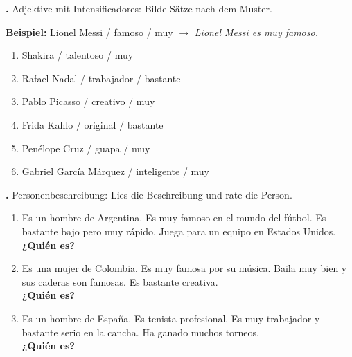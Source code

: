 \documentclass[11pt,a4paper]{article}
\newcommand{\luecke}[1]{\underline{\hspace{#1}}}
\newcommand{\punktebox}[1]{\hfill\fbox{\small \_\_/#1}}
\newcommand{\es}[1]{\textit{#1}}
\newcounter{aufgabe}
\newcommand{\aufgabe}[2]{%
    \stepcounter{aufgabe}%
    \vspace{0.8em}%
    \noindent\textbf{\theaufgabe.} #1 \punktebox{#2}%
    \vspace{0.3em}%
}
\begin{document}
\vspace{0.8em}

\aufgabe{Adjektive mit Intensificadores: Bilde Sätze nach dem Muster.}{6}

\textbf{Beispiel:} Lionel Messi / famoso / muy $\rightarrow$ \es{Lionel Messi es muy famoso.}

\vspace{0.3em}
\begin{enumerate}[label=\alph*), leftmargin=2em]
    \item Shakira / talentoso / muy\\[0.3em]
    \luecke{12cm}
    \item Rafael Nadal / trabajador / bastante\\[0.3em]
    \luecke{12cm}
    \item Pablo Picasso / creativo / muy\\[0.3em]
    \luecke{12cm}
    \item Frida Kahlo / original / bastante\\[0.3em]
    \luecke{12cm}
    \item Penélope Cruz / guapa / muy\\[0.3em]
    \luecke{12cm}
    \item Gabriel García Márquez / inteligente / muy\\[0.3em]
    \luecke{12cm}
\end{enumerate}

\vspace{0.8em}

\aufgabe{Personenbeschreibung: Lies die Beschreibung und rate die Person.}{6}

\begin{enumerate}[label=\alph*), leftmargin=2em]
    \item Es un hombre de Argentina. Es muy famoso en el mundo del fútbol. Es bastante bajo pero muy rápido. Juega para un equipo en Estados Unidos.\\[0.3em]
    \textbf{¿Quién es?} \luecke{4cm}

    \item Es una mujer de Colombia. Es muy famosa por su música. Baila muy bien y sus caderas son famosas. Es bastante creativa.\\[0.3em]
    \textbf{¿Quién es?} \luecke{4cm}

    \item Es un hombre de España. Es tenista profesional. Es muy trabajador y bastante serio en la cancha. Ha ganado muchos torneos.\\[0.3em]
    \textbf{¿Quién es?} \luecke{4cm}
\end{enumerate}
\end{document}
